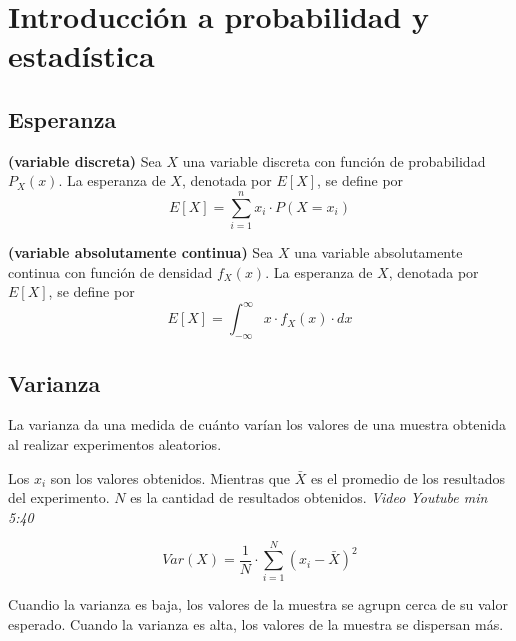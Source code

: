 \documentclass[../main.tex]{subfiles}
\begin{document}
\section{Introducción a probabilidad y estadística}
    \subsection{Esperanza}
        \begin{definition}\textbf{(variable discreta)}
            Sea $X$ una variable discreta con función de probabilidad $P_X(x)$. La esperanza de $X$, denotada por $E[X]$, se define por
            \begin{equation}
                E[X] = \sum_{i=1}^{n} x_i \cdot P(X=x_i)
            \end{equation}
        \end{definition}

        \begin{definition}\textbf{(variable absolutamente continua)}
            Sea $X$ una variable absolutamente continua con función de densidad $f_X(x)$. La esperanza de $X$, denotada por $E[X]$, se define por
            \begin{equation}
                E[X] = \int_{-\infty}^{\infty} x \cdot f_X(x) \cdot dx
            \end{equation}
        \end{definition}

    \subsection{Varianza}
        La varianza da una medida de cuánto varían los valores de una muestra obtenida al realizar experimentos aleatorios.

        Los $x_i$ son los valores obtenidos. Mientras que $\bar{X}$ es el promedio de los resultados del experimento. $N$ es la cantidad de resultados obtenidos. \textit{Video Youtube min 5:40} \cite{lista_intro_data_science}

        \begin{equation}
            Var(X) = \frac{1}{N} \cdot \sum_{i=1}^{N} (x_i - \bar{X})^2
        \end{equation}
        
        Cuandio la varianza es baja, los valores de la muestra se agrupn cerca de su valor esperado. Cuando la varianza es alta, los valores de la muestra se dispersan más.
\end{document}

